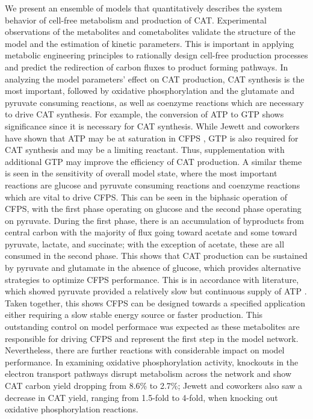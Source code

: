 \documentclass[12pt]{article}
\begin{document}
We present an ensemble of models that quantitatively describes the system behavior of cell-free metabolism and production of CAT.
Experimental observations of the metabolites and cometabolites validate the structure of the model and the estimation of kinetic parameters. 
This is important in applying metabolic engineering principles to rationally design cell-free production processes and predict the redirection of carbon fluxes to product forming pathways.
In analyzing the model parameters' effect on CAT production, CAT synthesis is the most important, followed by oxidative phosphorylation and the glutamate and pyruvate consuming reactions, as well as coenzyme reactions which are necessary to drive CAT synthesis.
For example, the conversion of ATP to GTP shows significance since it is necessary for CAT synthesis.
While Jewett and coworkers have shown that ATP may be at saturation in CFPS \cite{2008_jewett_molsysbiol}, GTP is also required for CAT synthesis and may be a limiting reactant. 
Thus, supplementation with additional GTP may improve the efficiency of CAT production.
A similar theme is seen in the sensitivity of overall model state, where the most important reactions are glucose and pyruvate consuming reactions and coenzyme reactions which are vital to drive CFPS.
This can be seen in the biphasic operation of CFPS, with the first phase operating on glucose and the second phase operating on pyruvate. 
During the first phase, there is an accumulation of byproducts from central carbon with the majority of flux going toward acetate and some toward pyruvate, lactate, and succinate; with the exception of acetate, these are all consumed in the second phase. 
This shows that CAT production can be sustained by pyruvate and glutamate in the absence of glucose, which provides alternative strategies to optimize CFPS performance.
This is in accordance with literature, which showed pyruvate provided a relatively slow but continuous supply of ATP \cite{swartz_nature2001}.
Taken together, this shows CFPS can be designed towards a specified application either requiring a slow stable energy source or faster production.
This outstanding control on model performace was expected as these metabolites are responsible for driving CFPS and represent the first step in the model network.
Nevertheless, there are further reactions with considerable impact on model performance.
In examining oxidative phosphorylation activity, knockouts in the electron transport pathways disrupt metabolism across the network and show CAT carbon yield dropping from 8.6\% to 2.7\%; Jewett and coworkers also saw a decrease in CAT yield, ranging from 1.5-fold to 4-fold, when knocking out oxidative phosphorylation reactions\cite{2008_jewett_molsysbiol}. 
\end{document}
